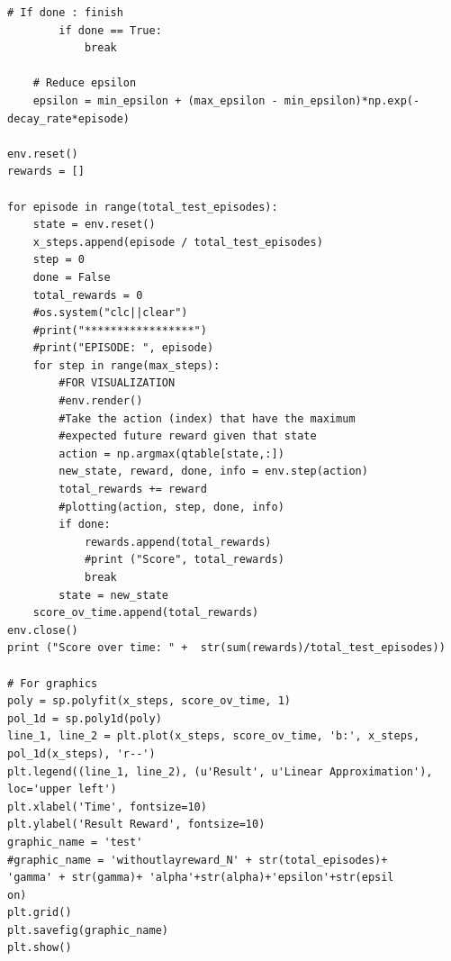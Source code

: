 \documentclass[a4paper]{report}
\theoremstyle{definition}
\theoremstyle{plain}
\theoremstyle{remark}
\theoremstyle{remark}
\theoremstyle{definition}
\begin{document}
\begin{lstlisting}[label=some-code, caption=main.py]
        # If done : finish
        if done == True: 
            break
    
    # Reduce epsilon
    epsilon = min_epsilon + (max_epsilon - min_epsilon)*np.exp(-decay_rate*episode)

env.reset()
rewards = []

for episode in range(total_test_episodes):
    state = env.reset()
    x_steps.append(episode / total_test_episodes)
    step = 0
    done = False
    total_rewards = 0
    #os.system("clc||clear")
    #print("*****************")
    #print("EPISODE: ", episode)
    for step in range(max_steps):
        #FOR VISUALIZATION
        #env.render()
        #Take the action (index) that have the maximum
        #expected future reward given that state
        action = np.argmax(qtable[state,:])
        new_state, reward, done, info = env.step(action)
        total_rewards += reward
        #plotting(action, step, done, info)
        if done:
            rewards.append(total_rewards)
            #print ("Score", total_rewards)
            break
        state = new_state
    score_ov_time.append(total_rewards)
env.close()
print ("Score over time: " +  str(sum(rewards)/total_test_episodes))

# For graphics
poly = sp.polyfit(x_steps, score_ov_time, 1)
pol_1d = sp.poly1d(poly)
line_1, line_2 = plt.plot(x_steps, score_ov_time, 'b:', x_steps, pol_1d(x_steps), 'r--')
plt.legend((line_1, line_2), (u'Result', u'Linear Approximation'), loc='upper left')
plt.xlabel('Time', fontsize=10)
plt.ylabel('Result Reward', fontsize=10)
graphic_name = 'test'
#graphic_name = 'withoutlayreward_N' + str(total_episodes)+ 
'gamma' + str(gamma)+ 'alpha'+str(alpha)+'epsilon'+str(epsil
on)
plt.grid()
plt.savefig(graphic_name)
plt.show()

\end{lstlisting}
\end{document}
